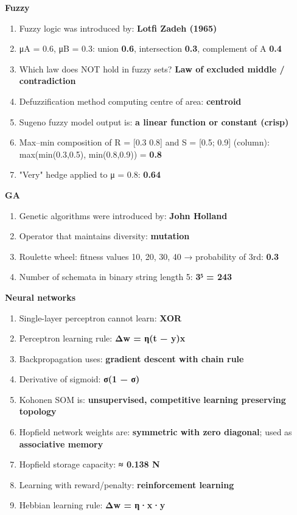 \textbf{Fuzzy}

\begin{enumerate}
\def\labelenumi{\arabic{enumi}.}
\setcounter{enumi}{40}
\tightlist
\item
  Fuzzy logic was introduced by: \textbf{Lotfi Zadeh (1965)}
\item
  μA = 0.6, μB = 0.3: union \textbf{0.6}, intersection \textbf{0.3}, complement of A \textbf{0.4}
\item
  Which law does NOT hold in fuzzy sets? \textbf{Law of excluded middle / contradiction}
\item
  Defuzzification method computing centre of area: \textbf{centroid}
\item
  Sugeno fuzzy model output is: \textbf{a linear function or constant (crisp)}
\item
  Max--min composition of R = {[}0.3 0.8{]} and S = {[}0.5; 0.9{]} (column): max(min(0.3,0.5), min(0.8,0.9)) = \textbf{0.8}
\item
  "Very" hedge applied to μ = 0.8: \textbf{0.64}
\end{enumerate}

\textbf{GA}

\begin{enumerate}
\def\labelenumi{\arabic{enumi}.}
\setcounter{enumi}{47}
\tightlist
\item
  Genetic algorithms were introduced by: \textbf{John Holland}
\item
  Operator that maintains diversity: \textbf{mutation}
\item
  Roulette wheel: fitness values 10, 20, 30, 40 → probability of 3rd: \textbf{0.3}
\item
  Number of schemata in binary string length 5: \textbf{3⁵ = 243}
\end{enumerate}

\textbf{Neural networks}

\begin{enumerate}
\def\labelenumi{\arabic{enumi}.}
\setcounter{enumi}{51}
\tightlist
\item
  Single-layer perceptron cannot learn: \textbf{XOR}
\item
  Perceptron learning rule: \textbf{Δw = η(t − y)x}
\item
  Backpropagation uses: \textbf{gradient descent with chain rule}
\item
  Derivative of sigmoid: \textbf{σ(1 − σ)}
\item
  Kohonen SOM is: \textbf{unsupervised, competitive learning preserving topology}
\item
  Hopfield network weights are: \textbf{symmetric with zero diagonal}; used as \textbf{associative memory}
\item
  Hopfield storage capacity: \textbf{≈ 0.138 N}
\item
  Learning with reward/penalty: \textbf{reinforcement learning}
\item
  Hebbian learning rule: \textbf{Δw = η·x·y}
\end{enumerate}


